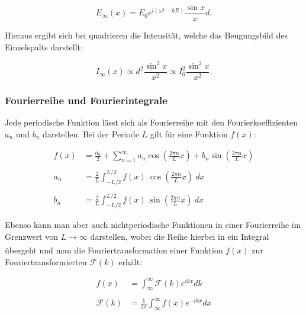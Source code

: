 \documentclass{article}
\begin{document}
\begin{equation}
    E_\infty (x) = E_0 e^{i(\omega t - kR)} \frac{\sin{x}}{x} d.
\end{equation}

Hieraus ergibt sich bei quadrieren die Intensität, welche das Beugungsbild des Einzelspalts darstellt:

\begin{equation}
    I_\infty (x) \propto d^2 \frac{\sin^2{x}}{x^2} \propto I_0^2 \frac{\sin^2{x}}{x^2}.
\end{equation}

\subsubsection{Fourierreihe und Fourierintegrale}

Jede periodische Funktion lässt sich als Fourierreihe mit den Fourierkoeffizienten $a_n$ und $b_n$ darstellen. Bei der Periode $L$ gilt für eine Funktion $f(x)$:

\begin{equation}
    \begin{split}
        f(x) &= \frac{a_0}{2} + \sum_{n=1}^\infty a_n \cos{\left( \frac{2 \pi n}{L} x \right)} + b_n \sin{\left( \frac{2 \pi n}{L} x \right)} \\ \\
        a_n &= \frac{2}{L} \int_{-L/2}^{L/2} f(x) \ \cos{\left( \frac{2 \pi n}{L} x \right)} \ dx \\ \\
        b_n &= \frac{2}{L} \int_{-L/2}^{L/2} f(x) \ \sin{\left( \frac{2 \pi n}{L} x \right)} \ dx
    \end{split}
\end{equation}

Ebenso kann man aber auch nichtperiodische Funktionen in einer Fourierreihe im Grenzwert von $L \xrightarrow[]{} \infty$ darstellen, wobei die Reihe hierbei in ein Integral übergeht und man die Fouriertransformation einer Funktion $f(x)$ zur Fouriertransformierten $\mathcal{F}(k)$ erhält:

\begin{equation}
    \begin{split}
        f(x) &= \int_\infty^\infty \mathcal{F}(k) e^{ikx} dk \\ \\
        \mathcal{F}(k) &= \frac{1}{2 \pi } \int_\infty^\infty f(x) e^{-ikx} dx
    \end{split}
\end{equation}
\end{document}
